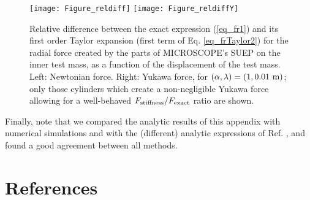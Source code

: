 \documentclass[12pt]{iopart}
\begin{document}
\begin{figure}%
\begin{center}
\texttt{[image: Figure\_reldiff]}
\texttt{[image: Figure\_reldiffY]}
\caption{Relative difference between the exact expression (\ref{eq_fr1}) and its first order Taylor expansion (first term of Eq. \ref{eq_frTaylor2}) for the radial force created by the parts of MICROSCOPE's SUEP on the inner test mass, as a function of the displacement of the test mass. Left: Newtonian force. Right: Yukawa force, for $(\alpha, 
\lambda) = (1, 0.01~{\rm m})$; only those cylinders which create a non-negligible Yukawa force allowing for a well-behaved $F_{\rm stiffness}/F_{\rm exact}$ ratio are shown.}
\label{fig_reldiff}
\end{center}
\end{figure}

Finally, note that we compared the analytic results of this appendix with numerical simulations and with the (different) analytic expressions of Ref. \cite{hoyle04}, and found a good agreement between all methods.


\section*{References}


\end{document}

